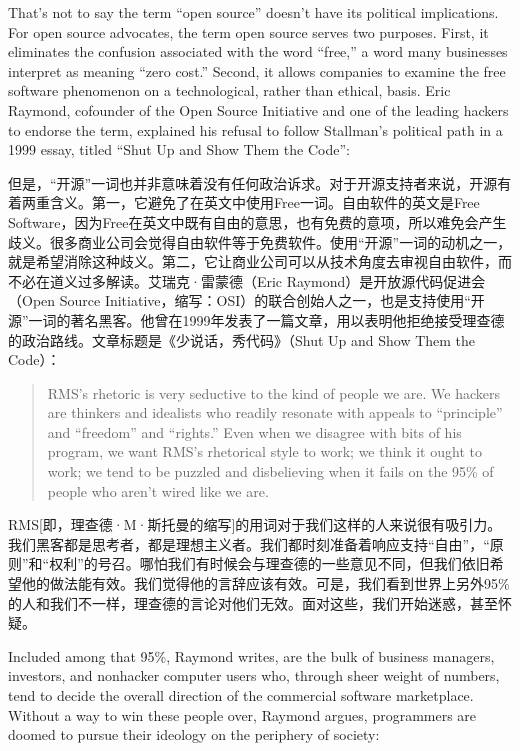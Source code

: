 \ifdefined\eng
That's not to say the term ``open source'' doesn't have its political implications. For open source advocates, the term open source serves two purposes. First, it eliminates the confusion associated with the word ``free,'' a word many businesses interpret as meaning ``zero cost.'' Second, it allows companies to examine the free software phenomenon on a technological, rather than ethical, basis. Eric Raymond, cofounder of the Open Source Initiative and one of the leading hackers to endorse the term, explained his refusal to follow Stallman's political path in a 1999 essay, titled ``Shut Up and Show Them the Code'':
\fi

\ifdefined\chs
但是，``开源''一词也并非意味着没有任何政治诉求。对于开源支持者来说，开源有着两重含义。第一，它避免了在英文中使用Free一词。自由软件的英文是Free Software，因为Free在英文中既有自由的意思，也有免费的意项，所以难免会产生歧义。很多商业公司会觉得自由软件等于免费软件。使用``开源''一词的动机之一，就是希望消除这种歧义。第二，它让商业公司可以从技术角度去审视自由软件，而不必在道义过多解读。艾瑞克·雷蒙德（Eric Raymond）是开放源代码促进会（Open Source Initiative，缩写：OSI）的联合创始人之一，也是支持使用``开源''一词的著名黑客。他曾在1999年发表了一篇文章，用以表明他拒绝接受理查德的政治路线。文章标题是《少说话，秀代码》（Shut Up and Show Them the Code）：
\fi

\ifdefined\eng
\begin{quote}
RMS's rhetoric is very seductive to the kind of people we are. We hackers are thinkers and idealists who readily resonate with appeals to ``principle'' and ``freedom'' and ``rights.'' Even when we disagree with bits of his program, we want RMS's rhetorical style to work; we think it ought to work; we tend to be puzzled and disbelieving when it fails on the 95\% of people who aren't wired like we are.
\end{quote}
\fi

\ifdefined\chs
RMS[即，理查德·M·斯托曼的缩写]的用词对于我们这样的人来说很有吸引力。我们黑客都是思考者，都是理想主义者。我们都时刻准备着响应支持``自由''，``原则''和``权利''的号召。哪怕我们有时候会与理查德的一些意见不同，但我们依旧希望他的做法能有效。我们觉得他的言辞应该有效。可是，我们看到世界上另外95\%的人和我们不一样，理查德的言论对他们无效。面对这些，我们开始迷惑，甚至怀疑。
\fi

\ifdefined\eng
Included among that 95\%, Raymond writes, are the bulk of business managers, investors, and nonhacker computer users who, through sheer weight of numbers, tend to decide the overall direction of the commercial software marketplace. Without a way to win these people over, Raymond argues, programmers are doomed to pursue their ideology on the periphery of society:
\fi

